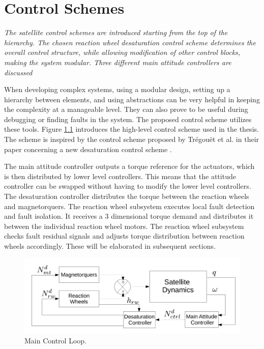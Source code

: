 \chapter{Control Schemes}
\textit{The satellite control schemes are introduced starting from the top of the hierarchy. The chosen reaction wheel desaturation control scheme determines the overall control structure, while allowing modification of other control blocks, making the system modular. Three different main attitude controllers are discussed}


When developing complex systems, using a modular design, setting up a hierarchy between elements, and using abstractions can be very helpful in keeping the complexity at a manageable level. They can also prove to be useful during debugging or finding faults in the system. The proposed control scheme utilizes these tools. Figure  \ref{fig:mainLoop} introduces the high-level control scheme used in the thesis. The scheme is inspired by the control scheme proposed by Trégouët et al. in their paper concerning a new desaturation control scheme \cite{DesatTregouet}. 

 The main attitude controller outputs a torque reference for the actuators, which is then distributed by lower level controllers. This means that the attitude controller can be swapped without having to modify the lower level controllers. The desaturation controller distributes the torque between the reaction wheels and magnetorquers. The reaction wheel subsystem executes local fault detection and fault isolation. It receives a 3 dimensional torque demand and distributes it between the individual reaction wheel motors. The reaction wheel subsystem checks fault residual signals and adjusts torque distribution between reaction wheels accordingly. These will be elaborated in subsequent sections.
 
\begin{figure}[h!]
	\centering 
	\includegraphics[width=160mm]{figures/mainLoop.pdf}	
	\caption{Main Control Loop.}
	\label{fig:mainLoop}
\end{figure}


